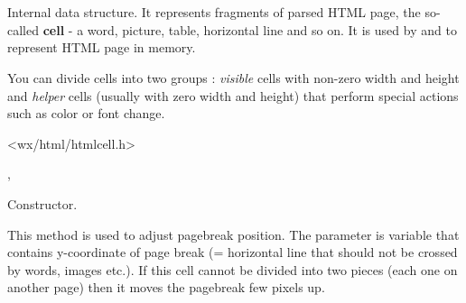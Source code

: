 
\section{}\label{wxhtmlcell}

Internal data structure. It represents fragments of parsed HTML
page, the so-called {\bf cell} - a word, picture, table, horizontal line and so on.
It is used by  and 
 to represent HTML page in memory.

You can divide cells into two groups : {\it visible} cells with non-zero width and
height and {\it helper} cells (usually with zero width and height) that
perform special actions such as color or font change.




<wx/html/htmlcell.h>


,


\label{wxhtmlcellwxhtmlcell}


Constructor.

\label{wxhtmlcelladjustpagebreak}


This method is used to adjust pagebreak position. The parameter is
variable that contains y-coordinate of page break (= horizontal line that
should not be crossed by words, images etc.). If this cell cannot be divided
into two pieces (each one on another page) then it moves the pagebreak
few pixels up.

